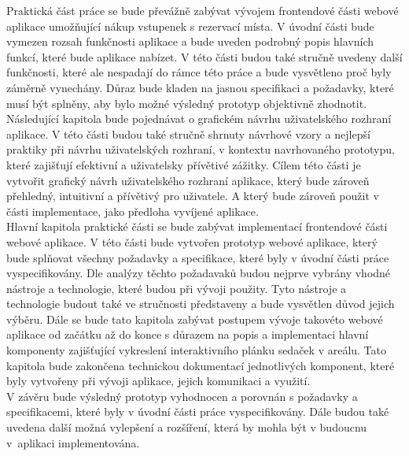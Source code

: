 Praktická část práce se bude převážně zabývat vývojem frontendové části webové aplikace umožňující nákup vstupenek s rezervací místa. V úvodní části bude vymezen rozsah funkčnosti aplikace a bude uveden podrobný popis hlavních funkcí, které bude aplikace nabízet. V této části budou také stručně uvedeny další funkčnosti, které ale nespadají do rámce této práce a bude vysvětleno proč byly záměrně vynechány. Důraz bude kladen na jasnou specifikaci a požadavky, které musí být splněny, aby bylo možné výsledný prototyp objektivně zhodnotit.\\

Následující kapitola bude pojednávat o grafickém návrhu uživatelského rozhraní aplikace. V této části budou také stručně shrnuty návrhové vzory a nejlepší praktiky při návrhu uživatelských rozhraní, v kontextu navrhovaného prototypu, které zajišťují efektivní a uživatelsky přívětivé zážitky. Cílem této části je vytvořit grafický návrh uživatelského rozhraní aplikace, který bude zároveň přehledný, intuitivní a přívětivý pro uživatele. A který bude zároveň použit v části implementace, jako předloha vyvíjené aplikace.\\

Hlavní kapitola praktické části se bude zabývat implementací frontendové části webové aplikace. V této části bude vytvořen prototyp webové aplikace, který bude splňovat všechny požadavky a specifikace, které byly v úvodní části práce vyspecifikovány. Dle analýzy těchto požadavaků budou nejprve vybrány vhodné nástroje a technologie, které budou při vývoji použity. Tyto nástroje a technologie budout také ve stručnosti představeny a bude vysvětlen důvod jejich výběru. Dále se bude tato kapitola zabývat postupem vývoje takovéto webové aplikace od začátku až do konce s důrazem na popis a implementaci hlavní komponenty zajišťující vykreslení interaktivního plánku sedaček v areálu. Tato kapitola bude zakončena technickou dokumentací jednotlivých komponent, které byly vytvořeny při vývoji aplikace, jejich komunikaci a využití.\\

V závěru bude výsledný prototyp vyhodnocen a porovnán s požadavky a specifikacemi, které byly v úvodní části práce vyspecifikovány. Dále budou také uvedena další možná vylepšení a rozšíření, která by mohla být v budoucnu v~aplikaci implementována.
